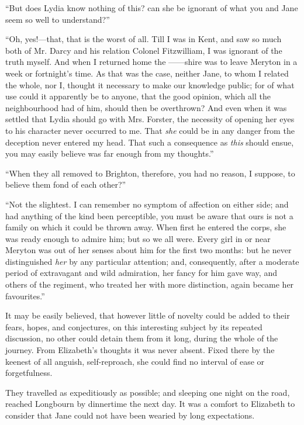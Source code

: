 \documentclass[12pt,openright]{book}
\begin{document}
“But does Lydia know nothing of this? can she be ignorant of what you and Jane seem so well to understand?”

“Oh, yes!—that, that is the worst of all. Till I was in Kent, and saw so much both of Mr. Darcy and his relation Colonel Fitzwilliam, I was ignorant of the truth myself. And when I returned home the ——shire was to leave Meryton in a week or fortnight’s time. As that was the case, neither Jane, to whom I related the whole, nor I, thought it necessary to make our knowledge public; for of what use could it apparently be to anyone, that the good opinion, which all the neighbourhood had of him, should then be overthrown? And even when it was settled that Lydia should go with Mrs. Forster, the necessity of opening her eyes to his character never occurred to me. That \textit{she} could be in any danger from the deception never entered my head. That such a consequence as \textit{this} should ensue, you may easily believe was far enough from my thoughts.”

“When they all removed to Brighton, therefore, you had no reason, I suppose, to believe them fond of each other?”

“Not the slightest. I can remember no symptom of affection on either side; and had anything of the kind been perceptible, you must be aware that ours is not a family on which it could be thrown away. When first he entered the corps, she was ready enough to admire him; but so we all were. Every girl in or near Meryton was out of her senses about him for the first two months: but he never distinguished \textit{her} by any particular attention; and, consequently, after a moderate period of extravagant and wild admiration, her fancy for him gave way, and others of the regiment, who treated her with more distinction, again became her favourites.”

It may be easily believed, that however little of novelty could be added to their fears, hopes, and conjectures, on this interesting subject by its repeated discussion, no other could detain them from it long, during the whole of the journey. From Elizabeth’s thoughts it was never absent. Fixed there by the keenest of all anguish, self-reproach, she could find no interval of ease or forgetfulness.

They travelled as expeditiously as possible; and sleeping one night on the road, reached Longbourn by dinnertime the next day. It was a comfort to Elizabeth to consider that Jane could not have been wearied by long expectations.
\end{document}
